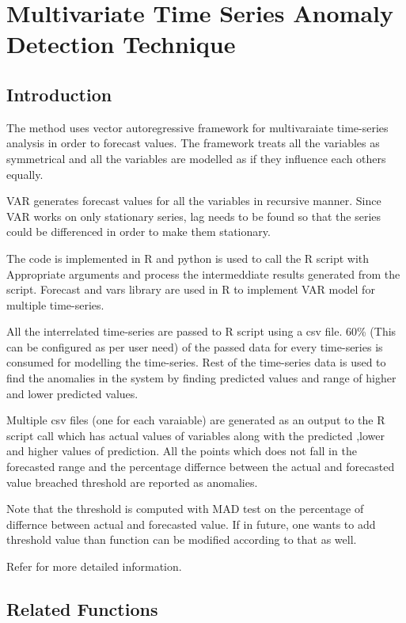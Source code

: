 \chapter{Multivariate Time Series Anomaly Detection Technique}

\section{Introduction}

The method uses vector autoregressive framework for multivaraiate time-series analysis
in order to forecast values. The framework treats all the variables as symmetrical
and all the variables are modelled as if they influence each others equally.

VAR generates forecast values for all the variables in recursive manner. Since VAR 
works on only stationary series, lag needs to be found so that the series could be
differenced in order to make them stationary.

The code is implemented in R and python is used to call the R script with Appropriate 
arguments and process the intermeddiate results generated from the script. Forecast and 
vars library are used in R to implement VAR model for multiple time-series.

All the interrelated time-series are passed to R script using a csv file. 60\% 
(This can be configured as per user need) of the passed data for every time-series 
is consumed for modelling the time-series. Rest of the time-series data is used to 
find the anomalies in the system by finding predicted values and range of higher and lower
predicted values.

Multiple csv files (one for each varaiable) are generated as an output to the R script 
call which has actual values of variables along with the predicted ,lower and higher 
values of prediction. All the points which does not fall in the forecasted range and 
the percentage differnce between the actual and forecasted value breached threshold 
are reported as anomalies.

Note that the threshold is computed with MAD test on the percentage of differnce between actual and forecasted value.
If in future, one wants to add threshold value than function can be modified according to that as well.

Refer \cite{var} for more detailed information.

\section{Related Functions}

